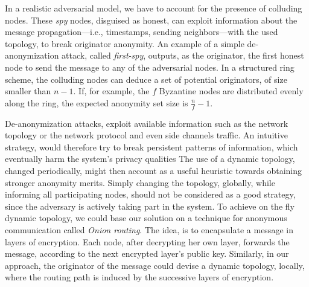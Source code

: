 In a realistic adversarial model, we have to account for the presence of colluding nodes. These \textit{spy} nodes, disguised as honest, can exploit information about the message propagation---i.e., timestamps, sending neighbors---with the used topology, to break originator anonymity. An example of a simple de-anonymization attack, called \textit{first-spy}, outputs, as the originator, the first honest node to send the message to any of the adversarial nodes. In a structured ring scheme, the colluding nodes can deduce a set of potential originators, of size smaller than $n-1$. If, for example, the $f$ Byzantine nodes are distributed evenly along the ring, the expected anonymity set size is $\frac{n}{f}-1$.
 
De-anonymization attacks, exploit available information such as the network topology or the network protocol and even side channels traffic. An intuitive strategy, would therefore try to break persistent patterns of information, which eventually harm the system’s privacy qualities    
The use of a dynamic topology, changed periodically, might then account as a useful heuristic towards obtaining stronger anonymity merits. Simply changing the topology, globally, while informing all participating nodes, should not be considered as a good strategy, since the adversary is actively taking part in the system. 
To achieve on the fly dynamic topology, we could base our solution on a technique for anonymous communication called \textit{Onion routing}. The idea, is to encapsulate a message in layers of encryption. Each node, after decrypting her own layer, forwards the message, according to the next encrypted layer’s public key. 
Similarly, in our approach, the originator of the message could devise a dynamic topology, locally, where the routing path is induced by the successive layers of encryption.


